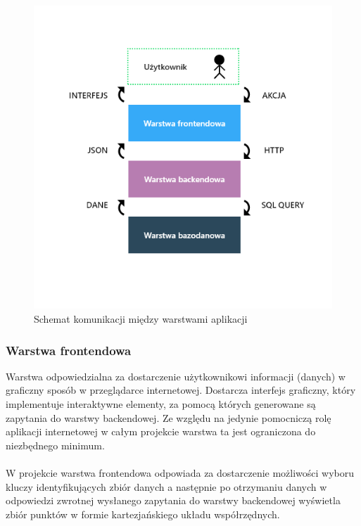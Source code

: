 \documentclass[eng,printmode]{mgr}
\begin{document}
\begin{figure}[H]
  \begin{center}
  \includegraphics[scale=0.7]{layers}
  \end{center}
  \caption{Schemat komunikacji między warstwami aplikacji}
  \label{fig:layers}
\end{figure}

\subsubsection{Warstwa frontendowa}
Warstwa odpowiedzialna za dostarczenie użytkownikowi informacji (danych) w graficzny sposób w przeglądarce internetowej. Dostarcza interfejs graficzny, który implementuje interaktywne elementy, za pomocą których generowane są zapytania do warstwy backendowej. Ze względu na jedynie pomocniczą rolę aplikacji internetowej w całym projekcie warstwa ta jest ograniczona do niezbędnego minimum.
\\\\
W projekcie warstwa frontendowa odpowiada za dostarczenie możliwości wyboru  kluczy identyfikujących zbiór danych a następnie po otrzymaniu danych w odpowiedzi zwrotnej wysłanego zapytania do warstwy backendowej wyświetla zbiór punktów w formie kartezjańskiego układu współrzędnych.
\end{document}
